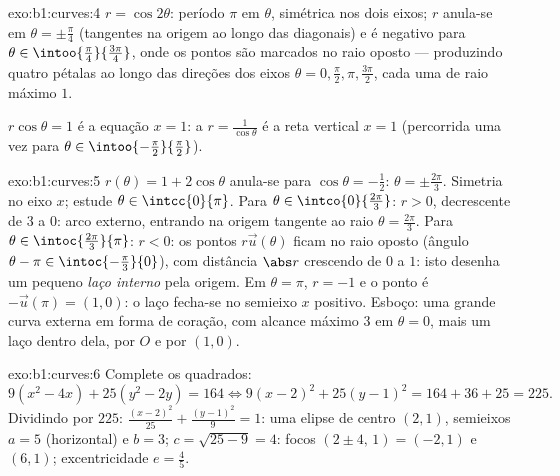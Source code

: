 \begin{solution}{exo:b1:curves:4}
$r = \cos 2\theta$: período $\pi$ em $\theta$, simétrica nos dois eixos; $r$
anula-se em $\theta = \pm\frac\pi4$ (tangentes na origem ao longo das diagonais) e é
negativo para $\theta \in
\intoo{\frac\pi4}{\frac{3\pi}{4}}$, onde os pontos são marcados no raio oposto ---
produzindo quatro pétalas ao longo das direções dos eixos $\theta = 0, \frac\pi2, \pi, \frac{3\pi}{2}$, cada
uma de raio máximo $1$.

$r\cos\theta = 1$ é a equação $x = 1$: a  $r =
\frac{1}{\cos\theta}$ é a reta vertical
$x = 1$ (percorrida uma vez para $\theta \in \intoo{-\frac\pi2}{\frac\pi2}$).
\end{solution}

\begin{solution}{exo:b1:curves:5}
$r(\theta) = 1 + 2\cos\theta$ anula-se para $\cos\theta = -\frac12$: $\theta = \pm\frac{2\pi}{3}$. Simetria no eixo $x$; estude $\theta \in \intcc{0}{\pi}$.
Para $\theta \in
\intco{0}{\frac{2\pi}{3}}$: $r > 0$, decrescente de $3$ a $0$: arco externo, entrando
na origem tangente ao raio $\theta =
\frac{2\pi}{3}$. Para $\theta \in \intoc{\frac{2\pi}{3}}{\pi}$: $r < 0$: os pontos
$r\vec u(\theta)$ ficam no raio oposto (ângulo $\theta - \pi \in \intoc{-\frac\pi3}{0}$), com distância $\abs r$
crescendo de $0$ a $1$: isto desenha um pequeno \emph{laço interno}
pela origem. Em $\theta = \pi$, $r = -1$ e o ponto é $-\vec u(\pi) = (1, 0)$: o laço fecha-se
no semieixo $x$ positivo. Esboço: uma grande curva externa em forma
de coração, com alcance máximo $3$ em $\theta = 0$, mais um laço dentro
dela, por $O$ e por $(1,0)$.
\end{solution}

\begin{solution}{exo:b1:curves:6}
Complete os quadrados:
\[
9(x^2 - 4x) + 25(y^2 - 2y) = 164
\iff 9(x-2)^2 + 25(y-1)^2 = 164 + 36 + 25 = 225 .
\]
Dividindo por $225$: $\frac{(x-2)^2}{25} + \frac{(y-1)^2}{9} = 1$: uma elipse de centro $(2, 1)$, semieixos
$a = 5$ (horizontal) e $b = 3$; $c = \sqrt{25 - 9} = 4$: focos $(2 \pm 4,\, 1) = (-2, 1)$ e $(6, 1)$;
excentricidade $e = \frac45$.
\end{solution}

